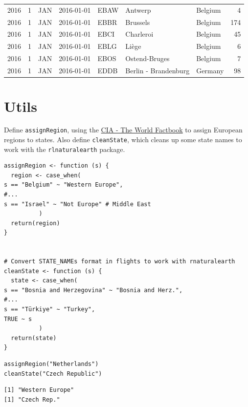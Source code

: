 \documentclass[8pt]{article}
\begin{document}
\begin{center}
\begin{tabular}{rrlrlllr}
2016 & 1 & JAN & 2016-01-01 & EBAW & Antwerp & Belgium & 4\\
2016 & 1 & JAN & 2016-01-01 & EBBR & Brussels & Belgium & 174\\
2016 & 1 & JAN & 2016-01-01 & EBCI & Charleroi & Belgium & 45\\
2016 & 1 & JAN & 2016-01-01 & EBLG & Liège & Belgium & 6\\
2016 & 1 & JAN & 2016-01-01 & EBOS & Ostend-Bruges & Belgium & 7\\
2016 & 1 & JAN & 2016-01-01 & EDDB & Berlin - Brandenburg & Germany & 98\\
\end{tabular}
\end{center}
\begin{latex}
\pagebreak
\end{latex}
\section{Utils}
\label{sec:orgdd2aa01}
Define \texttt{assignRegion}, using the \href{https://en.wikipedia.org/wiki/Regions\_of\_Europe}{CIA - The World Factbook} to assign European regions to states. Also define \texttt{cleanState}, which cleans up some state names to work with the \texttt{rlnaturalearth} package.

\begin{verbatim}
assignRegion <- function (s) {
  region <- case_when(
s == "Belgium" ~ "Western Europe",
#...
s == "Israel" ~ "Not Europe" # Middle East
	      )
  return(region)
}


# Convert STATE_NAMEs format in flights to work with rnaturalearth
cleanState <- function (s) {
  state <- case_when(
s == "Bosnia and Herzegovina" ~ "Bosnia and Herz.",
#...
s == "Türkiye" ~ "Turkey",
TRUE ~ s
	      )
  return(state)
}
\end{verbatim}

\begin{verbatim}
assignRegion("Netherlands")
cleanState("Czech Republic")
\end{verbatim}

\begin{verbatim}
[1] "Western Europe"
[1] "Czech Rep."
\end{verbatim}


\begin{latex}
\pagebreak
\end{latex}
\end{document}
